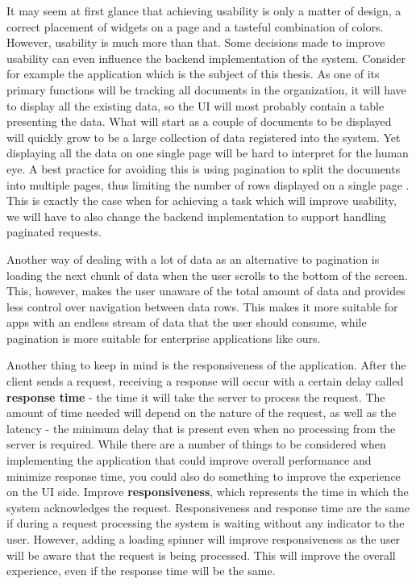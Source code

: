 It may seem at first glance that achieving usability is only a matter of design, a correct placement of widgets on a page and a tasteful combination of colors. However, usability is much more than that. Some decisions made to improve usability can even influence the backend implementation of the system. Consider for example the application which is the subject of this thesis. As one of its primary functions will be tracking all documents in the organization, it will have to display all the existing data, so the UI will most probably contain a table presenting the data. What will start as a couple of documents to be displayed will quickly grow to be a large collection of data registered into the system. Yet displaying all the data on one single page will be hard to interpret for the human eye. A best practice for avoiding this is using pagination to split the documents into multiple pages, thus limiting the number of rows displayed on a single page \cite{modernEnterpriseUiDesign}. This is exactly the case when for achieving a task which will improve usability, we will have to also change the backend implementation to support handling paginated requests.

Another way of dealing with a lot of data as an alternative to pagination is loading the next chunk of data when the user scrolls to the bottom of the screen. This, however, makes the user unaware of the total amount of data and provides less control over navigation between data rows. This makes it more suitable for apps with an endless stream of data that the user should consume, while pagination is more suitable for enterprise applications like ours.

Another thing to keep in mind is the responsiveness of the application. After the client sends a request, receiving a response will occur with a certain delay called \textbf{response time} - the time it will take the server to process the request. The amount of time needed will depend on the nature of the request, as well as the latency - the minimum delay that is present even when no processing from the server is required. While there are a number of things to be considered when implementing the application that could improve overall performance and minimize response time, you could also do something to improve the experience on the UI side. Improve \textbf{responsiveness}, which represents the time in which the system acknowledges the request. Responsiveness and response time are the same if during a request processing the system is waiting without any indicator to the user. However, adding a loading spinner will improve responsiveness as the user will be aware that the request is being processed. This will improve the overall experience, even if the response time will be the same.
